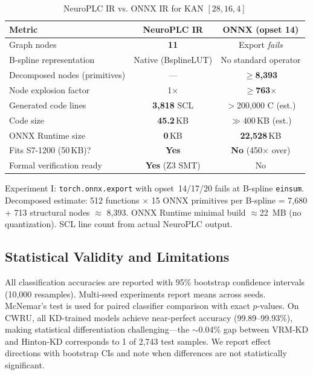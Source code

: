 \documentclass[journal,onecolumn]{IEEEtran}
\begin{document}
\begin{table}[t]
    \centering
    \caption{NeuroPLC IR vs. ONNX IR for KAN $[28,16,4]$}
    \label{tab:onnx_vs_ir}
    \small
    \begin{tabular}{lcc}
        \toprule
        \textbf{Metric} & \textbf{NeuroPLC IR} & \textbf{ONNX (opset 14)} \\
        \midrule
       Graph nodes                    & \textbf{11}            & Export \textit{fails} \\
       B-spline representation        & Native (BsplineLUT)    & No standard operator \\
       Decomposed nodes (primitives)  & ---                    & $\geq$\textbf{8,393} \\
       Node explosion factor          & 1$\times$               & $\geq$\textbf{763}$\times$ \\
       Generated code lines           & \textbf{3,818} SCL     & $>$200,000 C (est.) \\
       Code size                      & \textbf{45.2}\,KB      & $\gg$400\,KB (est.) \\
       ONNX Runtime size              & \textbf{0}\,KB          & \textbf{22,528}\,KB \\
       Fits S7-1200 (50\,KB)?        & \textbf{Yes}            & \textbf{No} (450$\times$ over) \\
       Formal verification ready      & \textbf{Yes} (Z3 SMT)  & No \\
        \bottomrule
    \end{tabular}
    \vspace{2pt}
    {\scriptsize Experiment I: \texttt{torch.onnx.export} with opset~14/17/20 fails at
   B-spline \texttt{einsum}. Decomposed estimate: 512 functions $\times$ 15 ONNX
   primitives per B-spline = 7{,}680 + 713 structural nodes $\approx$ 8{,}393.
   ONNX Runtime minimal build $\approx$22~MB (no quantization). SCL line count
   from actual NeuroPLC output.}
\end{table}

\subsection{Statistical Validity and Limitations}
\label{sec:limitations}

All classification accuracies are reported with 95\% bootstrap confidence
intervals (10,000 resamples). Multi-seed experiments report means across
seeds. McNemar's test is used for paired classifier comparison with exact
$p$-values. On CWRU, all KD-trained models achieve near-perfect accuracy
(99.89--99.93\%), making statistical differentiation challenging---the
$\sim$0.04\% gap between VRM-KD and Hinton-KD corresponds to 1 of 2,743
test samples. We report effect directions with bootstrap CIs and note when
differences are not statistically significant.
\end{document}
